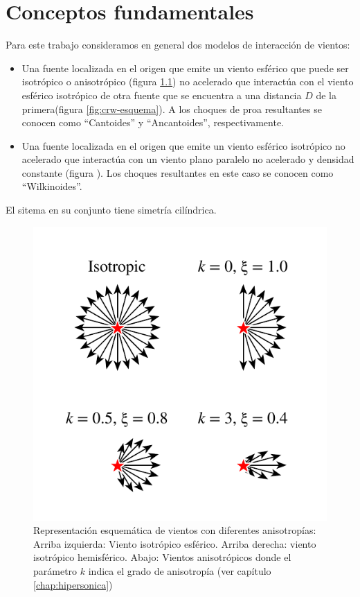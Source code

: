 \chapter{Conceptos fundamentales}
\label{sec:Modelo-generico}
Para este trabajo consideramos en general dos modelos de interacción de vientos:
\begin{itemize}
\item Una fuente localizada en el origen que emite un viento esférico que puede ser isotrópico o anisotrópico (figura \ref{fig:isotropic-aniso}) no acelerado que interactúa con el viento esférico isotrópico de otra fuente que se encuentra a una distancia $D$ de la primera(figura \ref{fig:crw-esquema}). A los choques de proa resultantes se conocen como ``Cantoides'' y ``Ancantoides'', respectivamente.
\item Una fuente localizada en el origen que emite un viento esférico isotrópico no acelerado que interactúa con un viento plano paralelo no acelerado y densidad constante (figura ). Los choques resultantes en este caso se conocen como ``Wilkinoides''.
\end{itemize}
El sitema en su conjunto tiene simetría cilíndrica.
\begin{figure}
  \includegraphics[width=0.5\linewidth]{./Figures/anisotropic-arrows}
  \caption{Representación esquemática de vientos con diferentes anisotropías: Arriba izquierda: Viento isotrópico esférico. Arriba derecha: viento isotrópico hemisférico. Abajo: Vientos anisotrópicos donde el parámetro $k$ indica el grado de anisotropía (ver capítulo \ref{chap:hipersonica})}
    \label{fig:isotropic-aniso}
\end{figure}

